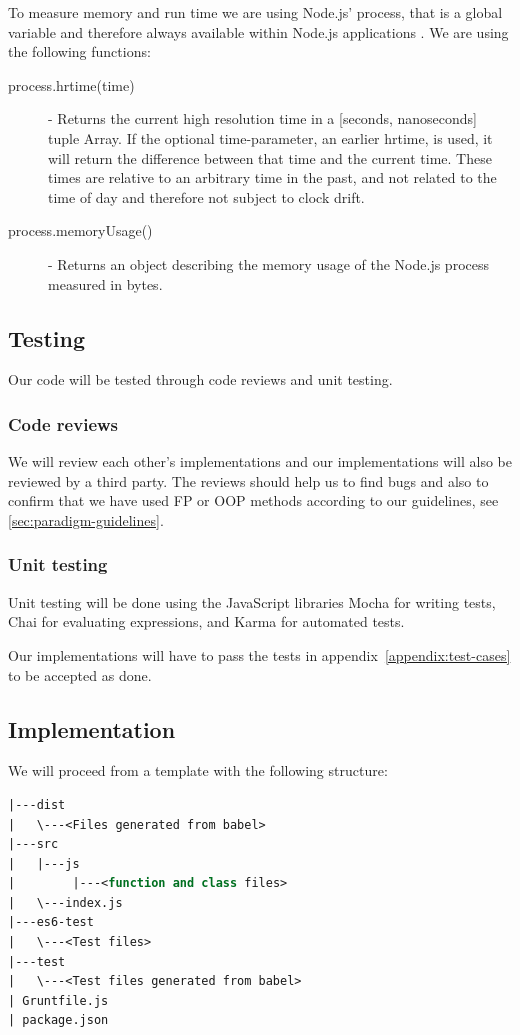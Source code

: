 \documentclass {article}
\begin{document}
To measure memory and run time we are using Node.js' process, that is a global variable and therefore always available within Node.js applications \cite{nodejs}. We are using the following functions:
\begin{description}
\item [process.hrtime(time)] - Returns the current high resolution time in a [seconds, nanoseconds] tuple Array. If the optional time-parameter, an earlier hrtime, is used, it will return the difference between that time and the current time. These times are relative to an arbitrary time in the past, and not related to the time of day and therefore not subject to clock drift.
\item [process.memoryUsage()] - Returns an object describing the memory usage of the Node.js process measured in bytes.
\end{description}
\subsection{Testing}
Our code will be tested through code reviews and unit testing.
\subsubsection{Code reviews}
We will review each other's implementations and our implementations will also be reviewed by a third party. The reviews should help us to find bugs and also to confirm that we have used FP or OOP methods according to our guidelines, see \ref{sec:paradigm-guidelines}.
\subsubsection{Unit testing}
Unit testing will be done using the JavaScript libraries Mocha \cite{mocha} for writing tests, Chai \cite{chai} for evaluating expressions, and Karma \cite{karma} for automated tests.

Our implementations will have to pass the tests in appendix~\ref{appendix:test-cases} to be accepted as done.
\subsection{Implementation}
We will proceed from a template with the following structure:

\begin{lstlisting}[language=Pascal, deletekeywords={function, and}, numbers=none]
|---dist
|   \---<Files generated from babel>
|---src
|   |---js
|        |---<function and class files>
|   \---index.js
|---es6-test
|   \---<Test files>
|---test
|   \---<Test files generated from babel>
| Gruntfile.js
| package.json
\end{lstlisting}
\end{document}
